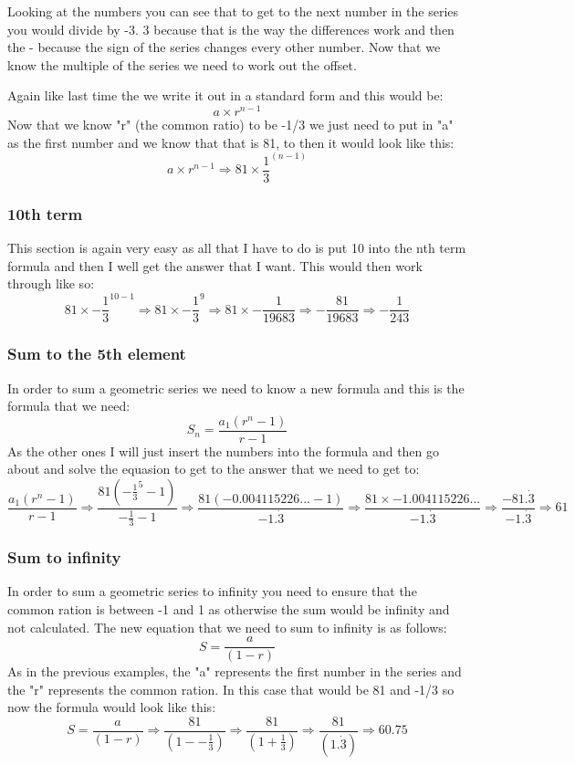 \documentclass{article}
\begin{document}
Looking at the numbers you can see that to get to the next number in the series you would divide by -3. 3 because that is the way the differences work and then the - because the sign of the series changes every other number. Now that we know the multiple of the series we need to work out the offset. 

Again like last time the we write it out in a standard form and this would be:
\[
	a \times r^{n-1}
\]
Now that we know "r" (the common ratio) to be -1/3 we just need to put in "a" as the first number and we know that that is 81, to then it would look like this:
\[
	a \times r^{n-1} \Rightarrow 81 \times \frac{1}{3}^{(n-1)}
\]
\subsubsection{10th term}
This section is again very easy as all that I have to do is put 10 into the nth term formula and then I well get the answer that I want. This would then work through like so:
\[
	81 \times -\frac{1}{3}^{10-1} \Rightarrow 81 \times -\frac{1}{3}^{9} \Rightarrow 81 \times -\frac{1}{19683} \Rightarrow -\frac{81}{19683} \Rightarrow -\frac{1}{243}
\]
\subsubsection{Sum to the 5th element}

In order to sum a geometric series we need to know a new formula and this is the formula that we need:
\[
	S_{n} = \frac{a_{1} ( r^{n} - 1 )}{ r - 1 }
\]
As the other ones I will just insert the numbers into the formula and then go about and solve the equasion to get to the answer that we need to get to:
\[
	\frac{a_{1} ( r^{n} - 1 )}{ r - 1 } \Rightarrow \frac{81 ( -\frac{1}{3}^{5} - 1 )}{ -\frac{1}{3} - 1 } \Rightarrow \frac{81 ( -0.004115226... - 1 )}{ -1.\dot{3} } \Rightarrow \frac{81 \times -1.004115226...}{-1.\dot{3}} \Rightarrow \frac{-81.\dot{3}}{-1.\dot{3}} \Rightarrow 61
\]
\subsubsection{Sum to infinity}

In order to sum a geometric series to infinity you need to ensure that the common ration is between -1 and 1 as otherwise the sum would be infinity and not calculated. The new equation that we need to sum to infinity is as follows: 
\[
	S = \frac{a}{(1 - r)}
\]
As in the previous examples, the "a" represents the first number in the series and the "r" represents the common ration. In this case that would be 81 and -1/3 so now the formula would look like this:
\[
	S = \frac{a}{(1 - r)} \Rightarrow \frac{81}{(1 - -\frac{1}{3})} \Rightarrow \frac{81}{(1 +\frac{1}{3})} \Rightarrow \frac{81}{(1.\dot{3})} \Rightarrow 60.75  
\]
\end{document}

